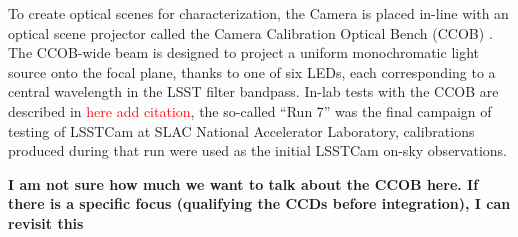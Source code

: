 To create optical scenes for characterization, the Camera is placed in-line with an optical scene projector called the Camera Calibration Optical Bench (CCOB) \citep{2024SPIE13103E..0WU}.
The CCOB-wide beam is designed to project a uniform monochromatic light source onto the focal plane, thanks to one of six LEDs, each corresponding to a central wavelength in the LSST filter bandpass.
In-lab tests with the CCOB are described in \textcolor{red}{here add citation}, the so-called ``Run 7'' was the final campaign of testing of LSSTCam at SLAC National Accelerator Laboratory,
calibrations produced during that run were used as the initial LSSTCam on-sky observations.

\textbf{I am not sure how much we want to talk about the CCOB here. If there is a specific focus (qualifying the CCDs before integration), I can revisit this}

